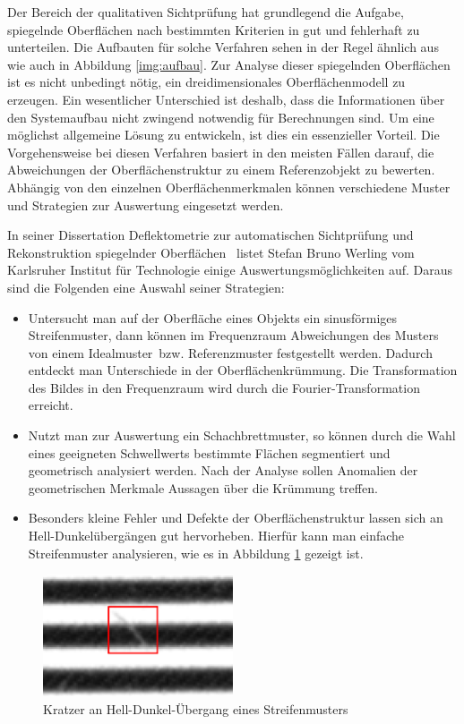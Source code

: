 Der Bereich der qualitativen Sichtprüfung hat grundlegend die Aufgabe, spiegelnde Oberflächen nach bestimmten Kriterien in gut und fehlerhaft zu unterteilen.
Die Aufbauten für solche Verfahren sehen in der Regel ähnlich aus wie auch in Abbildung \ref{img:aufbau}.
Zur Analyse dieser spiegelnden Oberflächen ist es nicht unbedingt nötig, ein dreidimensionales Oberflächenmodell zu erzeugen.
Ein wesentlicher Unterschied ist deshalb, dass die Informationen über den Systemaufbau nicht zwingend notwendig für Berechnungen sind.
Um eine möglichst allgemeine Lösung zu entwickeln, ist dies ein essenzieller Vorteil.
Die Vorgehensweise bei diesen Verfahren basiert in den meisten Fällen darauf, die Abweichungen der Oberflächenstruktur zu einem Referenzobjekt zu bewerten.
Abhängig von den einzelnen Oberflächenmerkmalen können verschiedene Muster und Strategien zur Auswertung eingesetzt werden.

\p
In seiner Dissertation \glqq Deflektometrie zur automatischen Sichtprüfung und Rekonstruktion spiegelnder Oberflächen\grqq ~\cite{kit_sbw} listet Stefan Bruno Werling vom Karlsruher Institut für Technologie einige Auswertungsmöglichkeiten auf.
Daraus sind die Folgenden eine Auswahl seiner Strategien:

\begin{itemize}
	\item Untersucht man auf der Oberfläche eines Objekts ein sinusförmiges Streifenmuster, dann können im Frequenzraum Abweichungen des Musters von einem \glqq Idealmuster\grqq ~bzw. Referenzmuster festgestellt werden.
	Dadurch entdeckt man Unterschiede in der Oberflächenkrüm\-mung.
	Die Transformation des Bildes in den Frequenzraum wird durch die Fourier-Transformation erreicht.
	
	\item Nutzt man zur Auswertung ein Schachbrettmuster, so können durch die Wahl eines geeigneten Schwellwerts bestimmte Flächen segmentiert und geometrisch analysiert werden.
	Nach der Analyse sollen Anomalien der geometrischen Merkmale Aussagen über die Krümmung treffen.
	
	\item Besonders kleine Fehler und Defekte der Oberflächenstruktur lassen sich an Hell-Dunkelübergängen gut hervorheben.
	Hierfür kann man einfache Streifenmuster analysieren, wie es in Abbildung \ref{img:scratch} gezeigt ist.
\end{itemize}

\begin{figure}[H]
	\centering
	\includegraphics[width=0.5\textwidth]{01_einfuehrung/deflektometrie/qualitativeSichtpruefung/figures/scratch}
	\caption[Kratzer an Hell-Dunkel-Übergang eines Streifenmusters]{Kratzer an Hell-Dunkel-Übergang eines Streifenmusters}
	\label{img:scratch}
\end{figure}

